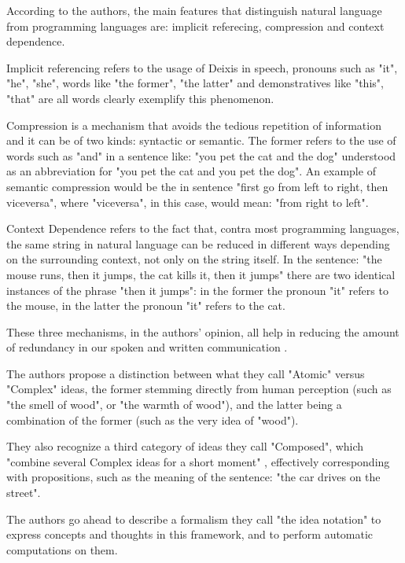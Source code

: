 According to the authors, the main features that distinguish natural language from programming languages are: implicit referecing, compression and context dependence.

Implicit referencing refers to the usage of Deixis in speech, pronouns such as "it", "he", "she", words like "the former", "the latter" and demonstratives like "this", "that" are all words clearly exemplify this phenomenon. 

Compression is a mechanism that avoids the tedious repetition of information and it can be of two kinds: syntactic or semantic. The former refers to the use of words such as "and" in a sentence like: "you pet the cat and the dog" understood as an abbreviation for "you pet the cat and you pet the dog". An example of semantic compression would be the in sentence "first go from left to right, then viceversa", where "viceversa", in this case, would mean: "from right to left".

Context Dependence refers to the fact that, contra most programming languages, the same string in natural language can be reduced in different ways depending on the surrounding context, not only on the string itself. In the sentence: "the mouse runs, then it jumps, the cat kills it, then it jumps" there are two identical instances of the phrase "then it jumps": in the former the pronoun "it" refers to the mouse, in the latter the pronoun "it" refers to the cat.

These three mechanisms, in the authors' opinion, all help in reducing the amount of redundancy in our spoken and written communication \cite{knoll2006pegasus}.

The authors propose a distinction between what they call "Atomic" versus "Complex" ideas, the former stemming directly from human perception (such as "the smell of wood", or "the warmth of wood"), and the latter being a combination of the former (such as the very idea of "wood").

They also recognize a third category of ideas they call "Composed", which "combine several Complex ideas for a short moment" \cite{knoll2006pegasus}, effectively corresponding with propositions, such as the meaning of the sentence: "the car drives on the street".

The authors go ahead to describe a formalism they call "the idea notation" to express concepts and thoughts in this framework, and to perform automatic computations on them.


